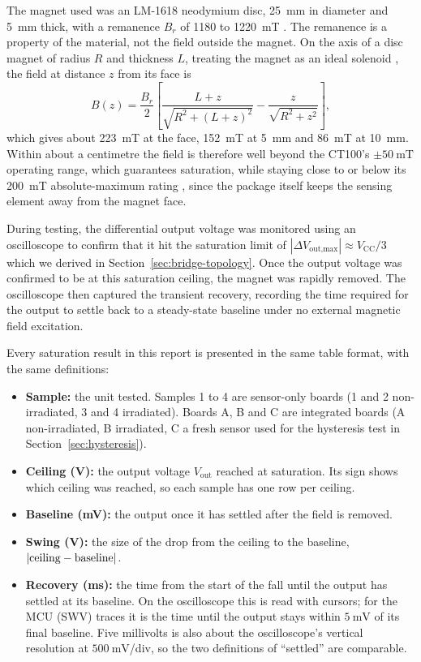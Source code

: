 \documentclass[12pt,a4paper]{article}
\begin{document}
The magnet used was an LM-1618 neodymium disc, \SI{25}{\milli\metre} in diameter and \SI{5}{\milli\metre} thick, with a remanence $B_r$ of 1180 to \SI{1220}{\milli\tesla} \cite{lm1618_datasheet}. The remanence is a property of the material, not the field outside the magnet. On the axis of a disc magnet of radius $R$ and thickness $L$, treating the magnet as an ideal solenoid \cite{camacho2013,shulman2022}, the field at distance $z$ from its face is
\begin{equation}
B(z) = \frac{B_r}{2}\left[\frac{L+z}{\sqrt{R^2+(L+z)^2}} - \frac{z}{\sqrt{R^2+z^2}}\right],
\label{eq:disc-magnet}
\end{equation}
which gives about \SI{223}{\milli\tesla} at the face, \SI{152}{\milli\tesla} at \SI{5}{\milli\metre} and \SI{86}{\milli\tesla} at \SI{10}{\milli\metre}. Within about a centimetre the field is therefore well beyond the CT100's $\pm\SI{50}{\milli\tesla}$ operating range, which guarantees saturation, while staying close to or below its \SI{200}{\milli\tesla} absolute-maximum rating \cite{ct100_datasheet}, since the package itself keeps the sensing element away from the magnet face.

During testing, the differential output voltage was monitored using an oscilloscope to confirm that it hit the saturation limit of \(\left| \Delta V_{\text{out,max}} \right| \approx V_{\text{CC}} / 3\) which we derived in Section~\ref{sec:bridge-topology}. Once the output voltage was confirmed to be at this saturation ceiling, the magnet was rapidly removed. The oscilloscope then captured the transient recovery, recording the time required for the output to settle back to a steady-state baseline under no external magnetic field excitation.

Every saturation result in this report is presented in the same table format, with the same definitions:
\begin{itemize}
\item \textbf{Sample:} the unit tested. Samples 1 to 4 are sensor-only boards (1 and 2 non-irradiated, 3 and 4 irradiated). Boards A, B and C are integrated boards (A non-irradiated, B irradiated, C a fresh sensor used for the hysteresis test in Section~\ref{sec:hysteresis}).
\item \textbf{Ceiling (V):} the output voltage $V_{\text{out}}$ reached at saturation. Its sign shows which ceiling was reached, so each sample has one row per ceiling.
\item \textbf{Baseline (mV):} the output once it has settled after the field is removed.
\item \textbf{Swing (V):} the size of the drop from the ceiling to the baseline, $|{\rm ceiling} - {\rm baseline}|$.
\item \textbf{Recovery (ms):} the time from the start of the fall until the output has settled at its baseline. On the oscilloscope this is read with cursors; for the MCU (SWV) traces it is the time until the output stays within $\SI{5}{\milli\volt}$ of its final baseline. Five millivolts is also about the oscilloscope's vertical resolution at $\SI{500}{\milli\volt}$/div, so the two definitions of ``settled'' are comparable.
\end{itemize}
\end{document}
